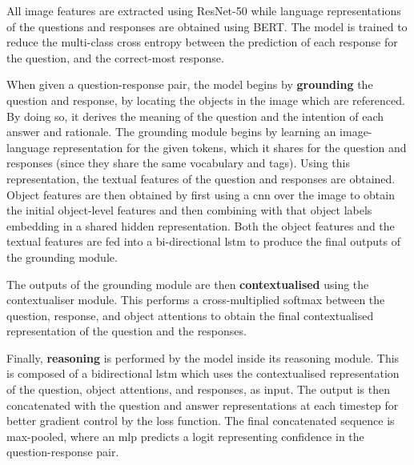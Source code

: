 All image features are extracted using ResNet-50\cite{he_deep_2015} while language representations of the questions and responses are obtained using BERT\cite{devlin_bert_2019}.
The model is trained to reduce the multi-class cross entropy between the prediction of each response for the question, and the correct-most response.

When given a question-response pair, the model begins by \textbf{grounding} the question and response, by locating the objects in the image which are referenced.
By doing so, it derives the meaning of the question and the intention of each answer and rationale.
The grounding module begins by learning an image-language representation for the given tokens, which it shares for the question and responses (since they share the same vocabulary and tags).
Using this representation, the textual features of the question and responses are obtained.
Object features are then obtained by first using a \gls{cnn} over the image to obtain the initial object-level features and then combining with that object labels embedding in a shared hidden representation.
Both the object features and the textual features are fed into a bi-directional \gls{lstm} to produce the final outputs of the grounding module.

The outputs of the grounding module are then \textbf{contextualised} using the contextualiser module.
This performs a cross-multiplied softmax between the question, response, and object attentions to obtain the final contextualised representation of the question and the responses.

Finally, \textbf{reasoning} is performed by the model inside its reasoning module.
This is composed of a bidirectional \gls{lstm} which uses the contextualised representation of the question, object attentions, and responses, as input.
The output is then concatenated with the question and answer representations at each timestep for better gradient control by the loss function.
The final concatenated sequence is max-pooled, where an \gls{mlp} predicts a \gls{logit} representing confidence in the question-response pair.

